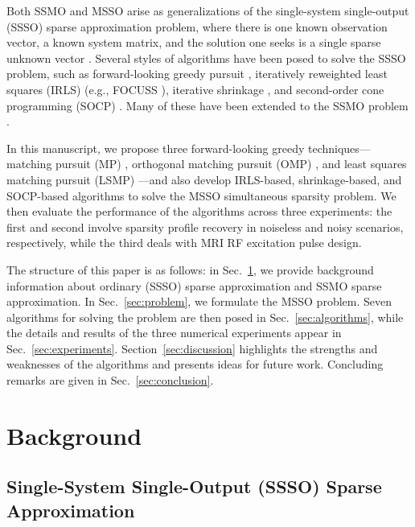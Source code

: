\documentclass[final]{siamltex}
\begin{document}
  Both SSMO and MSSO arise as generalizations of the single-system
  single-output (SSSO) sparse approximation problem, where there is
  one known observation vector, a known system matrix, and the
  solution one seeks is a single sparse unknown vector
  \cite{Gor1997,Che1998,Rao1998}.  Several styles of algorithms have
  been posed to solve the SSSO problem, such as forward-looking greedy
  pursuit \cite{Mal1993, Nat1995, Che1995, Dav1997, Cot1999},
  iteratively reweighted least squares (IRLS) \cite{Kar1970} (e.g.,
  FOCUSS \cite{Gor1997}), iterative shrinkage
  \cite{Don1994,Dau2004,Ela2006_TransIT,Ela2006}, and second-order
  cone programming (SOCP) \cite{Boy2004,Mal2005}.  Many of these have
  been extended to the SSMO problem
  \cite{Cot2005,Mal2005,Tro2006_I,Tro2006_II}.

  In this manuscript, we propose three forward-looking greedy
  techniques---matching pursuit (MP) \cite{Mal1993}, orthogonal
  matching pursuit (OMP) \cite{Nat1995,Che1995,Cot1999}, and least
  squares matching pursuit (LSMP) \cite{Cot1999}---and also develop
  IRLS-based, shrinkage-based, and SOCP-based algorithms to solve the
  MSSO simultaneous sparsity problem.  We then evaluate the
  performance of the algorithms across three experiments: the first
  and second involve sparsity profile recovery in noiseless and noisy
  scenarios, respectively, while the third deals with MRI RF
  excitation pulse design.

  The structure of this paper is as follows: in
  Sec.~\ref{sec:background}, we provide background information about
  ordinary (SSSO) sparse approximation and SSMO sparse approximation.
  In Sec.~\ref{sec:problem}, we formulate the MSSO problem.  Seven
  algorithms for solving the problem are then posed in
  Sec.~\ref{sec:algorithms}, while the details and results of the
  three numerical experiments appear in Sec.~\ref{sec:experiments}.
  Section~\ref{sec:discussion} highlights the strengths and weaknesses
  of the algorithms and presents ideas for future work.  Concluding
  remarks are given in Sec.~\ref{sec:conclusion}.

\section{Background}
\label{sec:background}

\subsection{Single-System Single-Output (SSSO) Sparse Approximation}
\end{document}
